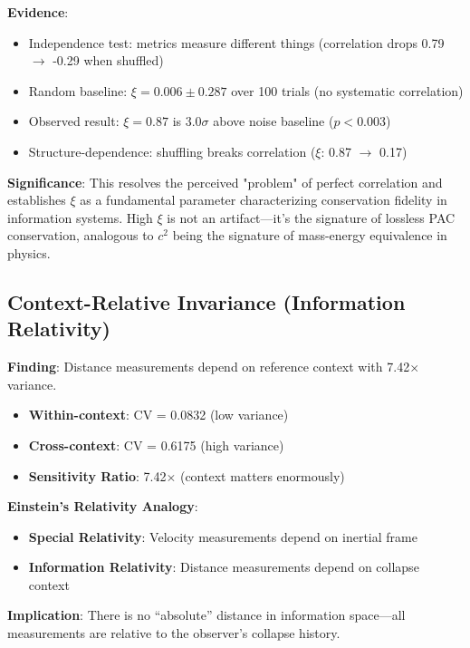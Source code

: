 \documentclass[11pt,a4paper]{article}
\begin{document}
\textbf{Evidence}:
\begin{itemize}
    \item Independence test: metrics measure different things (correlation drops 0.79 $\to$ -0.29 when shuffled)
    \item Random baseline: $\xi = 0.006 \pm 0.287$ over 100 trials (no systematic correlation)
    \item Observed result: $\xi = 0.87$ is $3.0\sigma$ above noise baseline ($p < 0.003$)
    \item Structure-dependence: shuffling breaks correlation ($\xi$: 0.87 $\to$ 0.17)
\end{itemize}

\textbf{Significance}: This resolves the perceived "problem" of perfect correlation and establishes $\xi$ as a fundamental parameter characterizing conservation fidelity in information systems. High $\xi$ is not an artifact---it's the signature of lossless PAC conservation, analogous to $c^2$ being the signature of mass-energy equivalence in physics.

\subsection{Context-Relative Invariance (Information Relativity)}

\textbf{Finding}: Distance measurements depend on reference context with 7.42$\times$ variance.

\begin{itemize}
    \item \textbf{Within-context}: CV = 0.0832 (low variance)
    \item \textbf{Cross-context}: CV = 0.6175 (high variance)
    \item \textbf{Sensitivity Ratio}: 7.42$\times$ (context matters enormously)
\end{itemize}

\textbf{Einstein's Relativity Analogy}:
\begin{itemize}
    \item \textbf{Special Relativity}: Velocity measurements depend on inertial frame
    \item \textbf{Information Relativity}: Distance measurements depend on collapse context
\end{itemize}

\textbf{Implication}: There is no ``absolute'' distance in information space---all measurements are relative to the observer's collapse history.
\end{document}
